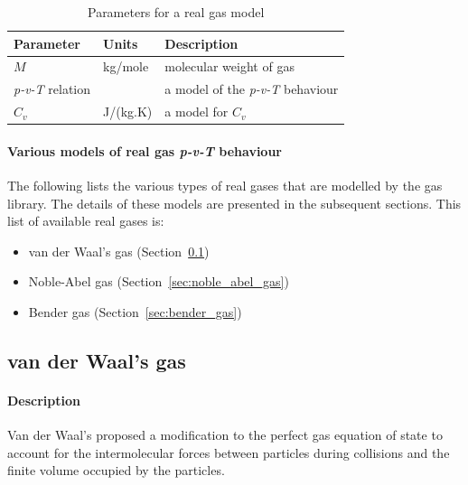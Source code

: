 \begin{table}[h!]
\caption{Parameters for a real gas model}
\label{tab:real-gas}
\begin{tabular}{llp{10cm}}
\toprule
Parameter & Units & Description \\ \midrule
$M$       & kg/mole & molecular weight of gas \\
\textit{p-v-T} relation & & a model of the \textit{p-v-T} behaviour \\
$C_v$  & J/(kg.K) & a model for $C_v$ \\
\bottomrule
\end{tabular}
\end{table}

\paragraph{Various models of real gas \textit{p-v-T} behaviour}
The following lists the various types of real gases that are modelled
by the gas library.
The details of these models are presented in the subsequent sections.
This list of available real gases is:
\begin{itemize}
\item van der Waal's gas (Section~\ref{sec:van_der_waals_gas})
\item Noble-Abel gas (Section~\ref{sec:noble_abel_gas})
\item Bender gas (Section~\ref{sec:bender_gas})
\end{itemize}

\subsection{van der Waal's gas}
\label{sec:van_der_waals_gas}
\paragraph{Description}
Van der Waal's proposed a modification to the perfect
gas equation of state to account for the intermolecular
forces between particles during collisions and
the finite volume occupied by the particles.

